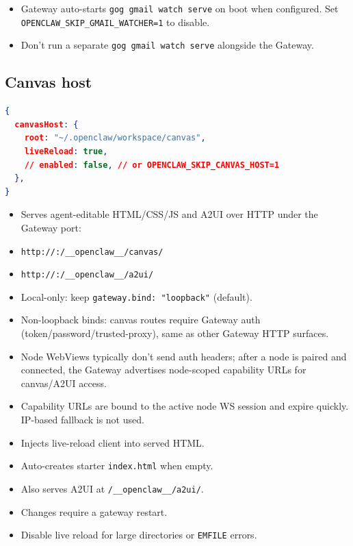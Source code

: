 \begin{itemize}
  \item Gateway auto-starts \texttt{gog gmail watch serve} on boot when configured. Set \texttt{OPENCLAW\_SKIP\_GMAIL\_WATCHER=1} to disable.
  \item Don't run a separate \texttt{gog gmail watch serve} alongside the Gateway.
\end{itemize}


\hrulefill


\subsection{Canvas host}


\begin{lstlisting}[language=json]
{
  canvasHost: {
    root: "~/.openclaw/workspace/canvas",
    liveReload: true,
    // enabled: false, // or OPENCLAW_SKIP_CANVAS_HOST=1
  },
}
\end{lstlisting}


\begin{itemize}
  \item Serves agent-editable HTML/CSS/JS and A2UI over HTTP under the Gateway port:
  \item \texttt{http://:/\_\_openclaw\_\_/canvas/}
  \item \texttt{http://:/\_\_openclaw\_\_/a2ui/}
  \item Local-only: keep \texttt{gateway.bind: "loopback"} (default).
  \item Non-loopback binds: canvas routes require Gateway auth (token/password/trusted-proxy), same as other Gateway HTTP surfaces.
  \item Node WebViews typically don't send auth headers; after a node is paired and connected, the Gateway advertises node-scoped capability URLs for canvas/A2UI access.
  \item Capability URLs are bound to the active node WS session and expire quickly. IP-based fallback is not used.
  \item Injects live-reload client into served HTML.
  \item Auto-creates starter \texttt{index.html} when empty.
  \item Also serves A2UI at \texttt{/\_\_openclaw\_\_/a2ui/}.
  \item Changes require a gateway restart.
  \item Disable live reload for large directories or \texttt{EMFILE} errors.
\end{itemize}


